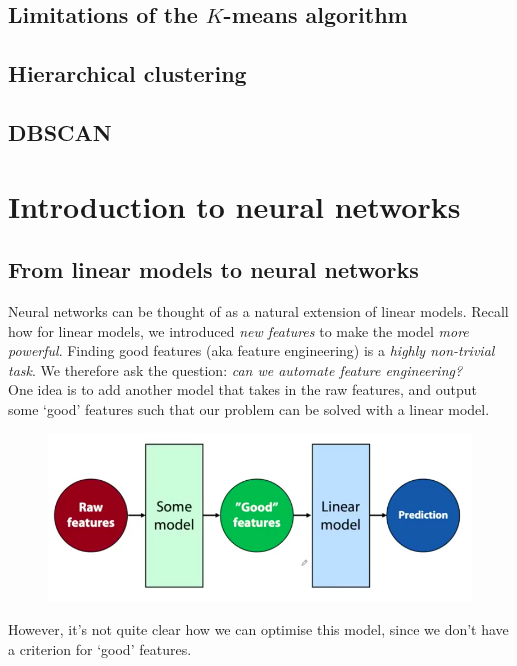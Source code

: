 \newpage
\subsection{Limitations of the $K$-means algorithm}




\newpage
\subsection{Hierarchical clustering}




\newpage
\subsection{DBSCAN}









\newpage
\section{Introduction to neural networks}

\subsection{From linear models to neural networks}
Neural networks can be thought of as a natural extension of linear models. Recall how for linear models, we introduced \textit{new features} to make the model \textit{more powerful}. Finding good features (aka feature engineering) is a \textit{highly non-trivial task}. We therefore ask the question: \textit{can we automate feature engineering?}\\

One idea is to add another model that takes in the raw features, and output some `good' features such that our problem can be solved with a linear model. 
\begin{figure}[H]
\centering
\includegraphics[scale=0.3]{automaticfeatureengineering.png}
\end{figure}
However, it's not quite clear how we can optimise this model, since we don't have a criterion for `good' features.\\

